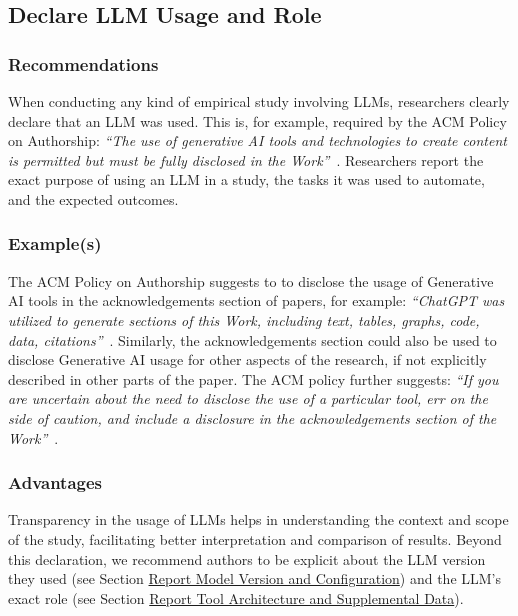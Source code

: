 



\subsection{Declare LLM Usage and Role}

\subsubsection{Recommendations}

When conducting any kind of empirical study involving LLMs, researchers \must clearly declare that an LLM was used.
This is, for example, required by the ACM Policy on Authorship: \emph{``The use of generative AI tools and technologies to create content is permitted but must be fully disclosed in the Work''}~\cite{ACM2023}.
Researchers \should report the exact purpose of using an LLM in a study, the tasks it was used to automate, and the expected outcomes.


\subsubsection{Example(s)}

The ACM Policy on Authorship suggests to to disclose the usage of Generative AI tools in the acknowledgements section of papers, for example: \emph{``ChatGPT was utilized to generate sections of this Work, including text, tables, graphs, code, data, citations''}~\cite{ACM2023}. 
Similarly, the acknowledgements section could also be used to disclose Generative AI usage for other aspects of the research, if not explicitly described in other parts of the paper.
The ACM policy further suggests: \emph{``If you are uncertain ­about the need to disclose the use of a particular tool, err on the side of caution, and include a disclosure in the acknowledgements section of the Work''}~\cite{ACM2023}.


\subsubsection{Advantages}

Transparency in the usage of LLMs helps in understanding the context and scope of the study, facilitating better interpretation and comparison of results.
Beyond this declaration, we recommend authors to be explicit about the LLM version they used (see Section \href{/guidelines/#report-model-version-and-configuration}{Report Model Version and Configuration}) and the LLM's exact role (see Section \href{/guidelines/#report-tool-architecture-and-supplemental-data}{Report Tool Architecture and Supplemental Data}).


